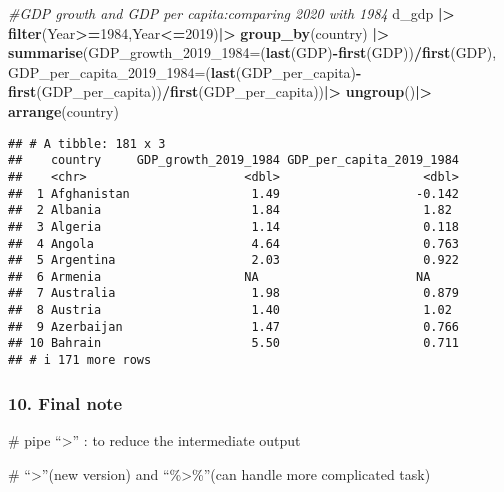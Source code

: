 \documentclass[
]{article}
\newenvironment{Shaded}{\begin{snugshade}}{\end{snugshade}}
\newcommand{\AttributeTok}[1]{\textcolor[rgb]{0.13,0.29,0.53}{#1}}
\newcommand{\CommentTok}[1]{\textcolor[rgb]{0.56,0.35,0.01}{\textit{#1}}}
\newcommand{\DecValTok}[1]{\textcolor[rgb]{0.00,0.00,0.81}{#1}}
\newcommand{\FunctionTok}[1]{\textcolor[rgb]{0.13,0.29,0.53}{\textbf{#1}}}
\newcommand{\NormalTok}[1]{#1}
\newcommand{\SpecialCharTok}[1]{\textcolor[rgb]{0.81,0.36,0.00}{\textbf{#1}}}
\begin{document}
\begin{Shaded}
\begin{Highlighting}[]
\CommentTok{\#GDP growth and GDP per capita:comparing 2020 with 1984}
\NormalTok{d\_gdp }\SpecialCharTok{|\textgreater{}}
  \FunctionTok{filter}\NormalTok{(Year}\SpecialCharTok{\textgreater{}=}\DecValTok{1984}\NormalTok{,Year}\SpecialCharTok{\textless{}=}\DecValTok{2019}\NormalTok{)}\SpecialCharTok{|\textgreater{}}
  \FunctionTok{group\_by}\NormalTok{(country) }\SpecialCharTok{|\textgreater{}}
  \FunctionTok{summarise}\NormalTok{(}\AttributeTok{GDP\_growth\_2019\_1984=}\NormalTok{(}\FunctionTok{last}\NormalTok{(GDP)}\SpecialCharTok{{-}}\FunctionTok{first}\NormalTok{(GDP))}\SpecialCharTok{/}\FunctionTok{first}\NormalTok{(GDP),}
            \AttributeTok{GDP\_per\_capita\_2019\_1984=}\NormalTok{(}\FunctionTok{last}\NormalTok{(GDP\_per\_capita)}\SpecialCharTok{{-}}\FunctionTok{first}\NormalTok{(GDP\_per\_capita))}\SpecialCharTok{/}\FunctionTok{first}\NormalTok{(GDP\_per\_capita))}\SpecialCharTok{|\textgreater{}}
  \FunctionTok{ungroup}\NormalTok{()}\SpecialCharTok{|\textgreater{}}
  \FunctionTok{arrange}\NormalTok{(country)}
\end{Highlighting}
\end{Shaded}

\begin{verbatim}
## # A tibble: 181 x 3
##    country     GDP_growth_2019_1984 GDP_per_capita_2019_1984
##    <chr>                      <dbl>                    <dbl>
##  1 Afghanistan                 1.49                   -0.142
##  2 Albania                     1.84                    1.82 
##  3 Algeria                     1.14                    0.118
##  4 Angola                      4.64                    0.763
##  5 Argentina                   2.03                    0.922
##  6 Armenia                    NA                      NA    
##  7 Australia                   1.98                    0.879
##  8 Austria                     1.40                    1.02 
##  9 Azerbaijan                  1.47                    0.766
## 10 Bahrain                     5.50                    0.711
## # i 171 more rows
\end{verbatim}

\hypertarget{final-note}{%
\subsubsection{10. Final note}\label{final-note}}

\# pipe ``\textbar\textgreater{}'' : to reduce the intermediate output

\# ``\textbar\textgreater{}''(new version) and ``\%\textgreater\%''(can
handle more complicated task)
\end{document}
